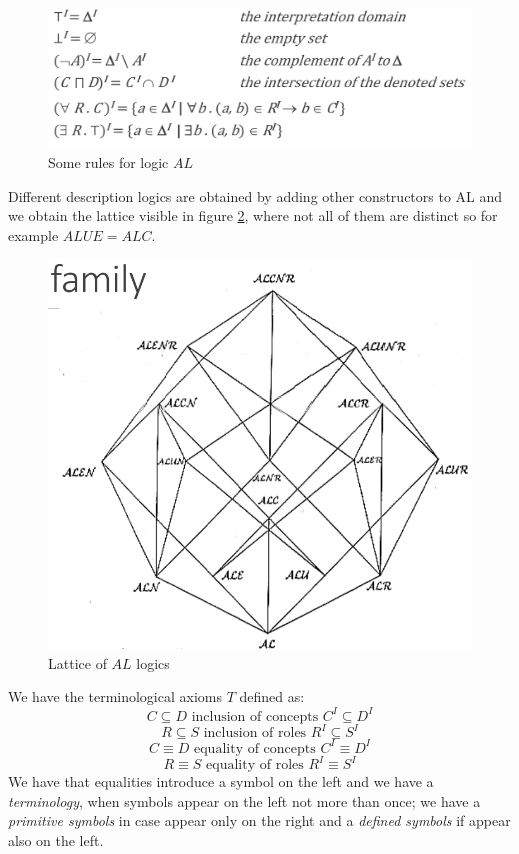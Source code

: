 \begin{figure}
	\includegraphics[width=\textwidth]{Images/rulesAL}
	\caption{Some rules for logic $AL$}
	\label{img:semanticAL}
\end{figure}
Different description logics are obtained by adding other constructors to AL and 
we obtain the lattice visible in figure \ref{img:ALLattice}, where not all of them 
are distinct so for example $ALUE = ALC$.

\begin{figure}
	\includegraphics[width=\textwidth]{Images/ALLattice}
	\caption{Lattice of $AL$ logics}
	\label{img:ALLattice}
\end{figure}
We have the terminological axioms $T$ defined as:
\[ C \subseteq D \text{ inclusion of concepts } C^I \subseteq D^I \]
\[ R \subseteq S \text{ inclusion of roles } R^I \subseteq S^I \]
\[ C \equiv D \text{ equality of concepts } C^I \equiv D^I \]
\[ R \equiv S \text{ equality of roles } R^I \equiv S^I \]
We have that equalities introduce a symbol on the left and we have a \emph{terminology},
when symbols appear on the left not more than once; we have a \emph{primitive symbols} in
case appear only on the right and a \emph{defined symbols} if appear also on the left.

